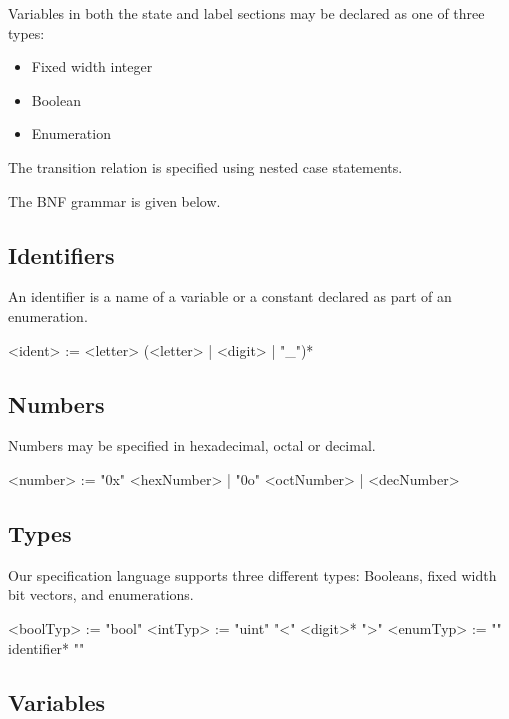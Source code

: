 Variables in both the state and label sections may be declared as one of three types:
\begin{itemize}
    \item Fixed width integer
    \item Boolean
    \item Enumeration
\end{itemize}

The transition relation is specified using nested case statements.

The BNF grammar is given below.

\subsection{Identifiers}

An identifier is a name of a variable or a constant declared as part of an enumeration.

\begin{bnflisting}
    <ident>    := <letter> (<letter> | <digit> | "_")*
\end{bnflisting}

\subsection{Numbers}

Numbers may be specified in hexadecimal, octal or decimal.

\begin{bnflisting}
    <number>    := "0x" <hexNumber>
                 | "0o" <octNumber>
                 | <decNumber>
\end{bnflisting}

\subsection{Types}

Our specification language supports three different types: Booleans, fixed width bit vectors, and enumerations.

\begin{bnflisting}
    <boolTyp>  := "bool"
    <intTyp>   := "uint" "<" <digit>* ">"
    <enumTyp>  := "{" identifier* "}"
\end{bnflisting}

\subsection{Variables}

